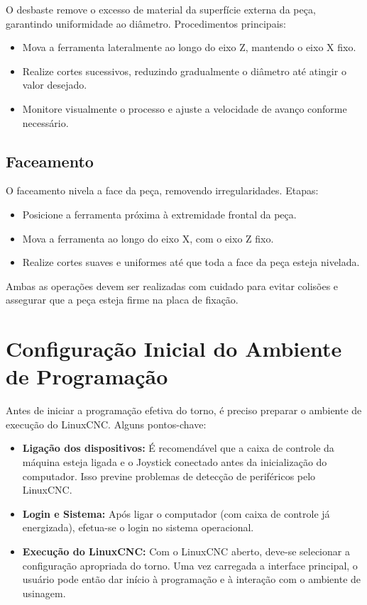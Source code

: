 O desbaste remove o excesso de material da superfície externa da peça, garantindo uniformidade ao diâmetro. Procedimentos principais:

\begin{itemize}
    \item Mova a ferramenta lateralmente ao longo do eixo Z, mantendo o eixo X fixo.
    \item Realize cortes sucessivos, reduzindo gradualmente o diâmetro até atingir o valor desejado.
    \item Monitore visualmente o processo e ajuste a velocidade de avanço conforme necessário.
\end{itemize}

\subsection{Faceamento}

O faceamento nivela a face da peça, removendo irregularidades. Etapas:

\begin{itemize}
    \item Posicione a ferramenta próxima à extremidade frontal da peça.
    \item Mova a ferramenta ao longo do eixo X, com o eixo Z fixo.
    \item Realize cortes suaves e uniformes até que toda a face da peça esteja nivelada.
\end{itemize}

Ambas as operações devem ser realizadas com cuidado para evitar colisões e assegurar que a peça esteja firme na placa de fixação.

\section{Configuração Inicial do Ambiente de Programação}

Antes de iniciar a programação efetiva do torno, é preciso preparar o ambiente de execução do LinuxCNC. Alguns pontos-chave:

\begin{itemize}
    \item \textbf{Ligação dos dispositivos:} É recomendável que a caixa de controle da máquina esteja ligada e o Joystick conectado antes da inicialização do computador. Isso previne problemas de detecção de periféricos pelo LinuxCNC.
    \item \textbf{Login e Sistema:} Após ligar o computador (com caixa de controle já energizada), efetua-se o login no sistema operacional. 
    \item \textbf{Execução do LinuxCNC:} Com o LinuxCNC aberto, deve-se selecionar a configuração apropriada do torno. Uma vez carregada a interface principal, o usuário pode então dar início à programação e à interação com o ambiente de usinagem.
\end{itemize}

